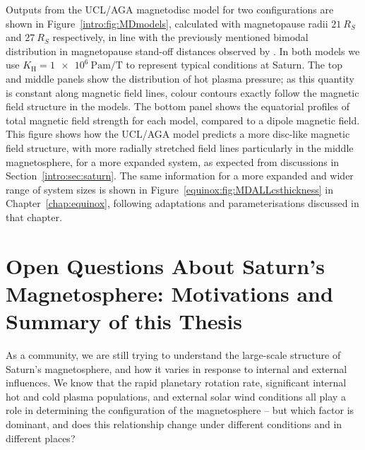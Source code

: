 Outputs from the UCL/AGA magnetodisc model for two configurations are shown in Figure~\ref{intro:fig:MDmodels}, calculated with magnetopause radii $\SI{21}{R_S}$ and $\SI{27}{R_S}$ respectively, in line with the previously mentioned bimodal distribution in magnetopause stand-off distances observed by \citet{achilleos2008,pilkington2015}. In both models we use $K_\mathrm{H} = \SI{1e6}{\pascal\meter\per\tesla}$ to represent typical conditions at Saturn. The top and middle panels show the distribution of hot plasma pressure; as this quantity is constant along magnetic field lines, colour contours exactly follow the magnetic field structure in the models. The bottom panel shows the equatorial profiles of total magnetic field strength for each model, compared to a dipole magnetic field. This figure shows how the UCL/AGA model predicts a more disc-like magnetic field structure, with more radially stretched field lines particularly in the middle magnetosphere, for a more expanded system, as expected from discussions in Section~\ref{intro:sec:saturn}. The same information for a more expanded and wider range of system sizes is shown in Figure~\ref{equinox:fig:MDALLcsthickness} in Chapter~\ref{chap:equinox}, following adaptations and parameterisations discussed in that chapter.

\section[Open Questions About Saturn's Magnetosphere]{Open Questions About Saturn's Magnetosphere: Motivations and Summary of this Thesis}
As a community, we are still trying to understand the large-scale structure of Saturn's magnetosphere, and how it varies in response to internal and external influences. We know that the rapid planetary rotation rate, significant internal hot and cold plasma populations, and external solar wind conditions all play a role in determining the configuration of the magnetosphere – but which factor is dominant, and does this relationship change under different conditions and in different places?

